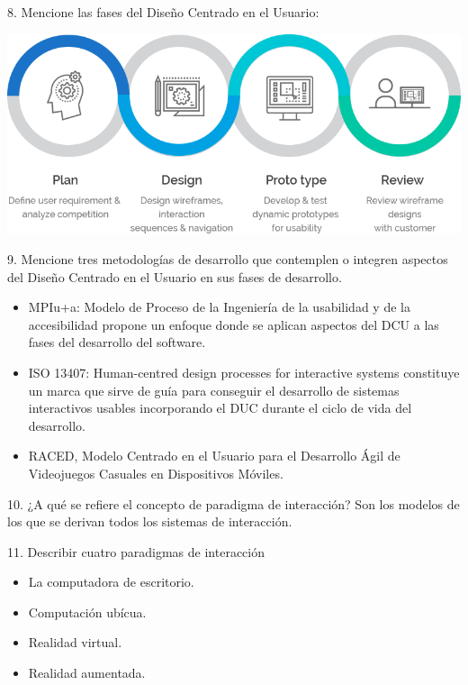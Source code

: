 \documentclass{beamer}
\begin{document}
\begin{frame}
\begin{block}{8. Mencione las fases del Diseño Centrado en el Usuario:}
\begin{center}
\includegraphics[scale = 0.35]{6.png}
\end{center}
\end{block}
\end{frame}

\begin{frame}
\begin{block}{9. Mencione tres metodologías de desarrollo que contemplen o integren aspectos del
Diseño Centrado en el Usuario en sus fases de desarrollo.}
\begin{itemize}
    \item MPIu+a: Modelo de Proceso de la Ingeniería de la usabilidad y de la accesibilidad propone un enfoque donde se aplican aspectos del DCU a las fases del desarrollo del software.
    \item ISO 13407: Human-centred design processes for interactive systems constituye un marca que sirve de guía para conseguir el desarrollo de sistemas interactivos usables incorporando el DUC durante el ciclo de vida del desarrollo.
    \item RACED, Modelo Centrado en el Usuario para el Desarrollo Ágil de Videojuegos Casuales en Dispositivos Móviles.
\end{itemize}
\end{block}
\end{frame}


\begin{frame}
\begin{block}{10. ¿A qué se refiere el concepto de paradigma de interacción?}
Son los modelos de los que se derivan todos los sistemas de interacción.
\end{block}
\begin{block}{11. Describir cuatro paradigmas de interacción}
\begin{itemize}
    \item La computadora de escritorio.
    \item Computación ubícua.
    \item Realidad virtual.
    \item Realidad aumentada.
\end{itemize}
\end{block}
\end{frame}
\end{document}
